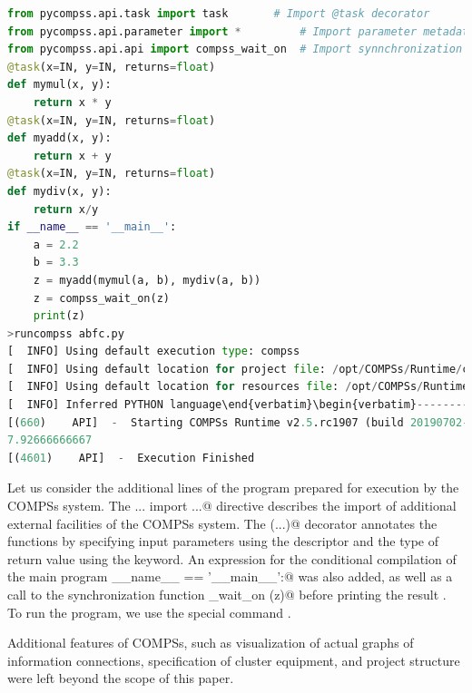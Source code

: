 \documentclass[10pt, a5paper]{article}
\begin{document}
\begin{lstlisting}[language=Python,caption={~},label={NZ:lst3}]
from pycompss.api.task import task	     # Import @task decorator
from pycompss.api.parameter import *	     # Import parameter metadata for the @task decorator
from pycompss.api.api import compss_wait_on  # Import synnchronization function
@task(x=IN, y=IN, returns=float)
def mymul(x, y):
    return x * y
@task(x=IN, y=IN, returns=float)
def myadd(x, y):
    return x + y
@task(x=IN, y=IN, returns=float)
def mydiv(x, y):
    return x/y
if __name__ == '__main__':
    a = 2.2
    b = 3.3
    z = myadd(mymul(a, b), mydiv(a, b))
    z = compss_wait_on(z)
    print(z)
>runcompss abfc.py
[  INFO] Using default execution type: compss
[  INFO] Using default location for project file: /opt/COMPSs/Runtime/configuration/xml/projects/default_project.xml
[  INFO] Using default location for resources file: /opt/COMPSs/Runtime/configuration/xml/resources/default_resources.xml
[  INFO] Inferred PYTHON language\end{verbatim}\begin{verbatim}----------------- Executing abfc.py --------------------------\end{verbatim}\begin{verbatim}WARNING: COMPSs Properties file is null. Setting default values
[(660)    API]  -  Starting COMPSs Runtime v2.5.rc1907 (build 20190702-1710.rb9d4035fbe39f8f3d692d485d359964971080cc0)
7.92666666667
[(4601)    API]  -  Execution Finished\end{lstlisting}
Let us consider the additional lines of the program prepared for exe\-cution by the COMPSs system. The \verb@from ... import ...@ directive describes the import of additional external facilities of the COMPSs system. The \verb@@task (...)@ decorator annotates the functions by specifying input parameters using the \verb@IN@ descriptor and the type of return value using the \verb@returns@ keyword. An expression for the conditional compi\-lation of the main program \verb@if __name__ == '__main__':@ was also added, as well as a call to the synchronization function \linebreak \verb@compss_wait_on (z)@ before printing the result \verb@z@. To run the program, we use the special command \verb@runcompss@.

Additional features of COMPSs, such as visualization of actual graphs of information connections, specification of cluster equipment, and project structure were left beyond the scope of this paper.
\end{document}
